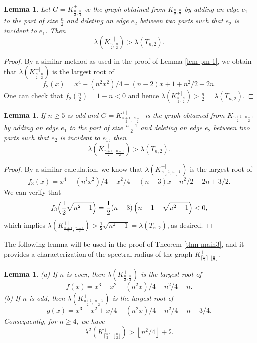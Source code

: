 \documentclass[11pt]{article}
\newtheorem{lemma}[theorem]{Lemma}
\begin{document}
\begin{lemma} \label{lem-equal-pm}
Let $G=K_{\frac{n}{2} ,  \frac{n}{2} }^{+|}$ be the graph obtained from
$K_{ \frac{n}{2},  \frac{n}{2}}$ by adding an edge $e_1$ to the part of size $ \frac{n}{2} $ and deleting an edge $e_2$ between two parts such that $e_2$ is incident to $e_1$. Then 
 \[  \lambda (K_{\frac{n}{2} ,  \frac{n}{2} }^{+|} )> 
\lambda (T_{n,2}). \] 
\end{lemma}

\begin{proof}
By a similar method
as used in the proof of Lemma \ref{lem-pm-1}, we obtain that $\lambda (K_{\frac{n}{2} ,  \frac{n}{2} }^{+|} )$
is the largest root of
\[  f_2(x)=
x^4 - {(n^2x^2)}/{4}  - (n-2)x +1+ {n^2}/{2} -2n. \]
One can check that $f_2(\frac{n}{2})=1-n<0$ and hence $\lambda (K_{\frac{n}{2} ,  \frac{n}{2} }^{+|} )>\frac{n}{2} =
\lambda (T_{n,2})$.
\end{proof}




\begin{lemma} \label{odd-n-pm-one}
If $n\ge 5$ is odd and 
$G=K_{\frac{n+1}{2} , \frac{n-1}{2}}^{+|}$ is the graph obtained from
$K_{ \frac{n+1}{2},  \frac{n-1}{2}}$ by adding an edge $e_1$ to the part of size $ \frac{n+1}{2} $ and deleting an edge $e_2$ between two parts such that $e_2$ is incident to $e_1$, then 
\[  \lambda (K_{ \frac{n+1}{2},\frac{n-1}{2}}^{+|})
>   \lambda (T_{n,2}). \]
\end{lemma}

\begin{proof}
By a similar calculation, we know that $\lambda
(K_{ \frac{n+1}{2}, \frac{n-1}{2}}^{+|} )$
is the largest root of
\[  f_3(x)=x^4 - {(n^2x^2)}/{4} +x^2/4 
- (n-3)x + {n^2}/{2} - 2n+ {3}/{2}. \]
We can verify that 
\[ f_3\Bigl(\frac{1}{2}\sqrt{n^2-1} \Bigr) 
= \frac{1}{2}(n-3)\left( n-1-\sqrt{n^2-1} \right)<0, \] 
which implies $\lambda (K_{ \frac{n+1}{2},\frac{n-1}{2}}^{+|})
> \frac{1}{2}\sqrt{n^2-1} = \lambda (T_{n,2})$, as desired.
\end{proof}


The following lemma will be used in the proof of Theorem \ref{thm-main3}, and it 
provides 
a characterization of the spectral radius of the graph
$K_{ \lceil \frac{n}{2} \rceil, \lfloor \frac{n}{2} \rfloor}^+$. 




\begin{lemma} \label{lem-21}
(a) If $n$ is even, then $\lambda(K_{\frac{n}{2}, \frac{n}{2}}^+)$
is the largest root of
\[  f(x)=x^3-x^2 - (n^2x)/4 + n^2/4 -n. \]
(b) If $n$ is odd, then $\lambda(K_{\frac{n+1}{2}, \frac{n-1}{2}}^+)$
is the largest root of
\[ g(x)=x^3 - x^2 + x /4 - (n^2x) /4 + n^2/4 - n + 3/4. \]
Consequently, for $n\ge 4$, we have
\begin{equation*} 
  \lambda^2 (K_{ \lceil \frac{n}{2} \rceil, \lfloor \frac{n}{2} \rfloor}^+) >\left\lfloor {n^2}/{4} \right\rfloor +2.
  \end{equation*}
\end{lemma}
\end{document}
